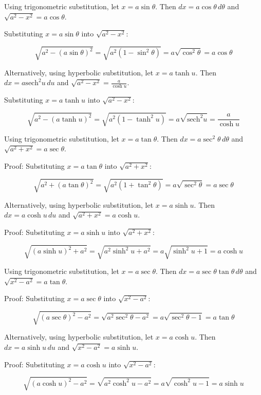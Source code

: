 \begin{example}
Using trigonometric substitution, let $x = a\sin\theta$. Then $dx = a\cos\theta \, d\theta$ and $\sqrt{a^2 - x^2} = a\cos\theta$.


Substituting $x = a\sin\theta$ into $\sqrt{a^2 - x^2}$:

$$
\sqrt{a^2 - (a\sin\theta)^2} = \sqrt{a^2(1 - \sin^2\theta)} = a\sqrt{\cos^2\theta} = a\cos\theta
$$

Alternatively, using hyperbolic substitution, let $x = a\tanh u$. Then $dx = a\text{sech}^2 u \, du$ and $\sqrt{a^2 - x^2} = \frac{a}{\cosh u}$.


Substituting $x = a\tanh u$ into $\sqrt{a^2 - x^2}$:

$$
\sqrt{a^2 - (a\tanh u)^2} = \sqrt{a^2\left(1 - \tanh^2 u\right)} = a\sqrt{\text{sech}^2 u} = \frac{a}{\cosh u}
$$
\end{example}

\begin{example}
Using trigonometric substitution, let $x = a\tan\theta$. Then $dx = a\sec^2\theta \, d\theta$ and $\sqrt{a^2 + x^2} = a\sec\theta$.

Proof:
Substituting $x = a\tan\theta$ into $\sqrt{a^2 + x^2}$:

$$
\sqrt{a^2 + (a\tan\theta)^2} = \sqrt{a^2(1 + \tan^2\theta)} = a\sqrt{\sec^2\theta} = a\sec\theta
$$

Alternatively, using hyperbolic substitution, let $x = a\sinh u$. Then $dx = a\cosh u \, du$ and $\sqrt{a^2 + x^2} = a\cosh u$.

Proof:
Substituting $x = a\sinh u$ into $\sqrt{a^2 + x^2}$:

$$
\sqrt{(a\sinh u)^2 + a^2} = \sqrt{a^2\sinh^2 u + a^2} = a\sqrt{\sinh^2 u + 1} = a\cosh u
$$
\end{example}

\begin{example}
Using trigonometric substitution, let $x = a\sec\theta$. Then $dx = a\sec\theta\tan\theta \, d\theta$ and $\sqrt{x^2 - a^2} = a\tan\theta$.

Proof:
Substituting $x = a\sec\theta$ into $\sqrt{x^2 - a^2}$:

$$
\sqrt{(a\sec\theta)^2 - a^2} = \sqrt{a^2\sec^2\theta - a^2} = a\sqrt{\sec^2\theta - 1} = a\tan\theta
$$

Alternatively, using hyperbolic substitution, let $x = a\cosh u$. Then $dx = a\sinh u \, du$ and $\sqrt{x^2 - a^2} = a\sinh u$.

Proof:
Substituting $x = a\cosh u$ into $\sqrt{x^2 - a^2}$:

$$
\sqrt{(a\cosh u)^2 - a^2} = \sqrt{a^2\cosh^2 u - a^2} = a\sqrt{\cosh^2 u - 1} = a\sinh u
$$
\end{example}

